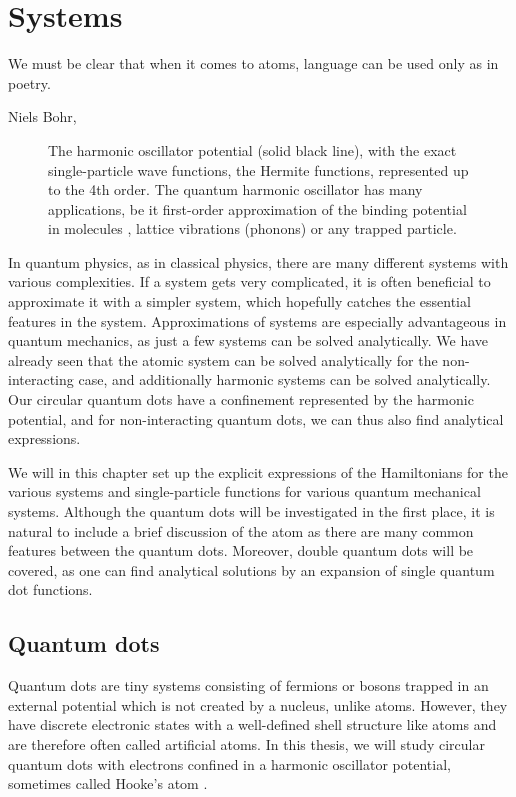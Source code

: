\chapter{Systems} \label{chp:systems}
\epigraph{We must be clear that when it comes to atoms, language can be used only as in poetry.}{Niels Bohr, \cite{heisenberg_physics_1971}}
\begin{figure}[H]
	\centering
	
	\caption{The harmonic oscillator potential (solid black line), with the exact single-particle wave functions, the Hermite functions, represented up to the 4th order. The quantum harmonic oscillator has many applications, be it first-order approximation of the binding potential in molecules \cite{wilson_molecular_1955}, lattice vibrations (phonons) \cite{cahill_heat_1989} or any trapped particle.}
	\label{fig:harmonicoscillator}
\end{figure}

In quantum physics, as in classical physics, there are many different systems with various complexities. If a system gets very complicated, it is often beneficial to approximate it with a simpler system, which hopefully catches the essential features in the system. Approximations of systems are especially advantageous in quantum mechanics, as just a few systems can be solved analytically. We have already seen that the atomic system can be solved analytically for the non-interacting case, and additionally harmonic systems can be solved analytically. Our circular quantum dots have a confinement represented by the harmonic potential, and for non-interacting quantum dots, we can thus also find analytical expressions. 

We will in this chapter set up the explicit expressions of the Hamiltonians for the various systems and single-particle functions for various quantum mechanical systems. Although the quantum dots will be investigated in the first place, it is natural to include a brief discussion of the atom as there are many common features between the quantum dots. Moreover, double quantum dots will be covered, as one can find analytical solutions by an expansion of single quantum dot functions.

\section{Quantum dots} \label{sec:quantumdots}
Quantum dots are tiny systems consisting of fermions or bosons trapped in an external potential which is not created by a nucleus, unlike atoms. However, they have discrete electronic states with a well-defined shell structure like atoms and are therefore often called artificial atoms. In this thesis, we will study circular quantum dots with electrons confined in a harmonic oscillator potential, sometimes called Hooke's atom \cite{liang_hookes_2011}. 

